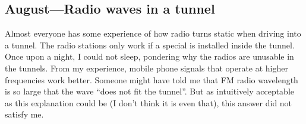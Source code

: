 \documentclass{article}
\begin{document}
  


  
    



\subsection{August---Radio waves in a tunnel}

Almost everyone has some experience of how radio turns static when driving into a tunnel. The radio stations only work if a special   is installed inside the tunnel. Once upon a night, I could not sleep, pondering why the  radios are unusable in the tunnels. From my experience, mobile phone signals that operate at higher frequencies work better. Someone might have told me that FM radio wavelength is so large that the wave ``does not fit the tunnel''. But as intuitively acceptable as this explanation could be (I don't think it is even that), this answer did not satisfy me.
\end{document}
